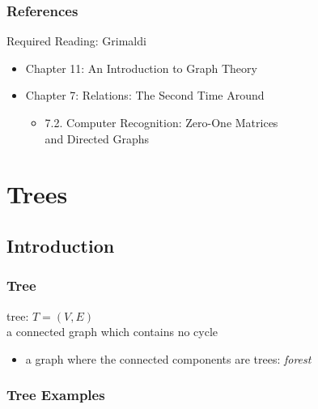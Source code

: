 \documentclass[dvipsnames]{beamer}
\begin{document}
\begin{frame}
  \frametitle{References}

  \begin{block}{Required Reading: Grimaldi}
    \begin{itemize}
      \item Chapter 11: \alert{An Introduction to Graph Theory}

      \item Chapter 7: Relations: The Second Time Around
      \begin{itemize}
        \item 7.2. \alert{Computer Recognition: Zero-One Matrices\\
                          and Directed Graphs}
      \end{itemize}
    \end{itemize}
  \end{block}
\end{frame}

\section{Trees}

\subsection{Introduction}

\begin{frame}
  \frametitle{Tree}

  \begin{definition}
    \alert{tree}: $T=(V,E)$\\
    a connected graph which contains no cycle
  \end{definition}

  \pause
  \begin{itemize}
    \item a graph where the connected components are trees: \emph{forest}
  \end{itemize}
\end{frame}

\begin{frame}
  \frametitle{Tree Examples}

  \begin{example}
    \begin{center}
    \end{center}
  \end{example}
\end{frame}
\end{document}
